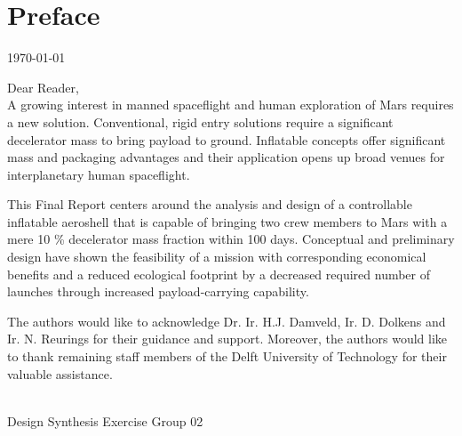\section*{Preface}\label{cha:preface}

\begin{flushright}
	\today
\end{flushright}

Dear Reader,	
\\ [1cm]
A growing interest in manned spaceflight and human exploration of Mars requires a new solution. Conventional, rigid entry solutions require a significant decelerator mass to bring payload to ground. Inflatable concepts offer significant mass and packaging advantages and their application opens up broad venues for interplanetary human spaceflight. 

This Final Report centers around the analysis and design of a controllable inflatable aeroshell that is capable of bringing two crew members to Mars with a mere 10 \% decelerator mass fraction within 100 days. Conceptual and preliminary design have shown the feasibility of a mission with corresponding economical benefits and a reduced ecological footprint by a decreased required number of launches through increased payload-carrying capability.

The authors would like to acknowledge Dr. Ir. H.J. Damveld, Ir. D. Dolkens and Ir. N. Reurings for their guidance and support. Moreover, the authors would like to thank remaining staff members of the Delft University of Technology for their valuable assistance.


\\ [1.5cm]
Design Synthesis Exercise Group 02
